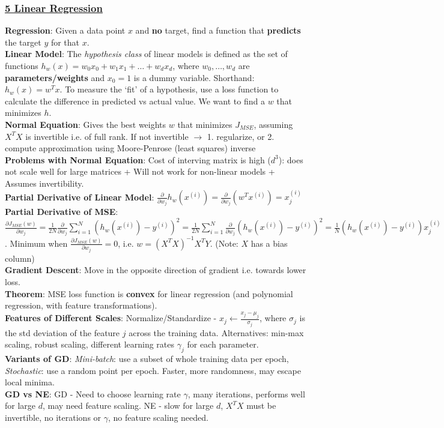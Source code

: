 \documentclass{article}
\begin{document}
\begin{multicols*}{3}
\subsubsection*{\underline{5 Linear Regression}}
\textbf{Regression}: Given a data point $x$ and \textbf{no} target, find a function that \textbf{predicts} the target $y$ for that $x$.\\
\textbf{Linear Model}: The \textit{hypothesis class} of linear models is defined as the set of functions $h_w(x)=w_0x_0+w_1x_1+\dots+w_dx_d$, where $w_0,\dots,w_d$ are \textbf{parameters/weights} and $x_0=1$ is a dummy variable. Shorthand: $h_w(x)=w^Tx$. To measure the `fit' of a hypothesis, use a loss function to calculate the difference in predicted vs actual value. We want to find a $w$ that minimizes $h$. \\
\textbf{Normal Equation}: Gives the best weights $w$ that minimizes $J_{MSE}$, assuming $X^TX$ is invertible i.e. of full rank. If not invertible $\to$ 1. regularize, or 2. compute approximation using Moore-Penrose (least squares) inverse \\
\textbf{Problems with Normal Equation}: Cost of interving matrix is high ($d^3$): does not scale well for large matrices + Will not work for non-linear models + Assumes invertibility. \\
\textbf{Partial Derivative of Linear Model}: $\frac{\partial}{\partial w_j}h_w(x^{(i)})=\frac{\partial}{\partial w_j}(w^Tx^{(i)})=x_j^{(i)}$\\
\textbf{Partial Derivative of MSE}:
$\frac{\partial J_{MSE}(w)}{\partial w_j} =\frac{1}{2N}\frac{\partial}{\partial w_j}\sum^N_{i=1}(h_w(x^{(i)})-y^{(i)})^2 =\frac{1}{2N}\sum^N_{i=1}\frac{\partial}{\partial w_j}(h_w(x^{(i)})-y^{(i)})^2 
=\frac{1}{N}(h_w(x^{(i)})-y^{(i)})x_j^{(i)}
$. Minimum when $\frac{\partial J_{MSE}(w)}{\partial w_j}=0$, i.e. $w=(X^TX)^{-1}X^TY$. (Note: $X$ has a bias column)\\
\textbf{Gradient Descent}: Move in the opposite direction of gradient i.e. towards lower loss. \\
\textbf{Theorem}: MSE loss function is \textbf{convex} for linear regression (and polynomial regression, with feature transformations). \\
\textbf{Features of Different Scales}: Normalize/Standardize - $x_j\leftarrow\frac{x_j-\mu_j}{\sigma_j}$, where $\sigma_j$ is the std deviation of the feature $j$ across the training data. 
Alternatives: min-max scaling, robust scaling, different learning rates $\gamma_j$ for each parameter.\\
\textbf{Variants of GD}: \textit{Mini-batch}: use a subset of whole training data per epoch, \textit{Stochastic}: use a random point per epoch. Faster, more randomness, may escape local minima. \\
\textbf{GD vs NE}: GD - Need to choose learning rate $\gamma$, many iterations, performs well for large $d$, may need feature scaling. NE - slow for large $d$, $X^TX$ must be invertible, no iterations or $\gamma$, no feature scaling needed.

\end{multicols*}
\end{document}
